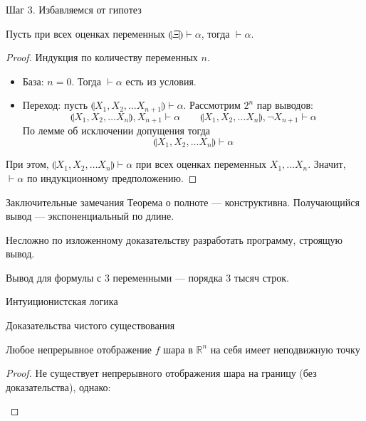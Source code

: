 \documentclass[aspectratio=169]{beamer}
\begin{document}
\begin{frame}{Шаг 3. Избавляемся от гипотез}

\begin{lemmarus}Пусть при всех оценках переменных
$\llparenthesis\Xi\rrparenthesis \vdash \alpha$, тогда
$\vdash\alpha$.
\end{lemmarus}\pause

\begin{proof}
Индукция по количеству переменных $n$.

\begin{itemize}
\item База: $n=0$. Тогда $\vdash\alpha$ есть из условия.\pause
\item Переход: пусть $\llparenthesis X_1, X_2,  \dots X_{n+1} \rrparenthesis \vdash \alpha$.
Рассмотрим $2^n$ пар выводов: $$\llparenthesis X_1, X_2, \dots X_n\rrparenthesis,X_{n+1} \vdash \alpha\quad\quad\llparenthesis X_1, X_2, \dots X_n\rrparenthesis,\neg X_{n+1} \vdash \alpha$$
По лемме об исключении допущения тогда
$$\llparenthesis X_1, X_2, \dots X_n \rrparenthesis \vdash \alpha$$
\end{itemize}
При этом, $\llparenthesis X_1, X_2, \dots X_n \rrparenthesis  \vdash \alpha$ при всех оценках
переменных $X_1, \dots X_n$. Значит, $\vdash\alpha$ по индукционному предположению.
\end{proof}

\end{frame}

\begin{frame}{Заключительные замечания}
Теорема о полноте --- конструктивна. Получающийся вывод --- экспоненциальный по длине.

Несложно по изложенному доказательству разработать программу, строящую вывод.

Вывод для формулы с 3 переменными --- порядка 3 тысяч строк.

\end{frame}

\begin{frame}
\LARGE\begin{center}Интуиционистская логика\end{center}
\end{frame}

\begin{frame}{Доказательства чистого существования}

\begin{thmrus} 
Любое непрерывное отображение $f$ шара в $\mathbb{R}^n$ на себя имеет неподвижную точку\end{thmrus}
\begin{proof}Не существует непрерывного отображения шара на границу (без доказательства), однако:
\begin{center}\end{center}
\end{proof}

\end{frame}
\end{document}
